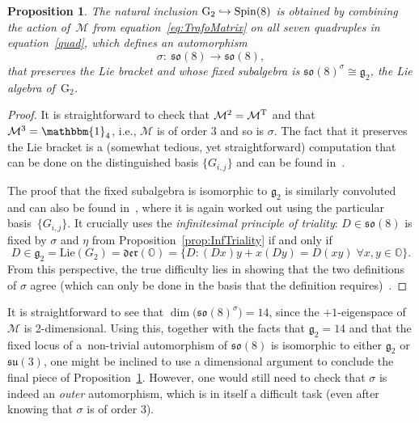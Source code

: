 \documentclass[10pt,a4paper]{amsart}
\numberwithin{equation}{section}
\newcommand{\Oct}{{\mathbb O}}
\newcommand{\GG}{{\rm G}_2}
\newtheorem{Proposition}[Theorem]{Proposition}
 { \theoremstyle{definition}
\newtheorem{Definition}[Theorem]{Definition}
\newtheorem{Remark}[Theorem]{Remark} }
\begin{document}
\begin{Proposition}\label{propf2} The natural inclusion $\GG \hookrightarrow \mathrm{Spin}(8)$ is obtained by combining the action of~$ \mathcal{M}$ from equation~\eqref{eq:TrafoMatrix} on all seven quadruples in equation~\eqref{quad}, which defines an automorphism \begin{equation} \sigma \colon \ \mathfrak{so}(8) \rightarrow \mathfrak{so}(8),\label{autosigma}\end{equation} that preserves the Lie bracket and whose fixed subalgebra is $\mathfrak{so}(8)^\sigma \cong \mathfrak{g}_2$, the Lie algebra of~$\mathrm{G}_2$.
\end{Proposition}
\begin{proof}
It is straightforward to check that $ \mathcal{M}^2 = \mathcal{M}^{\rm T}$ and that $ \mathcal{M}^3 = \mathbbm{1}_4$, i.e., $ \mathcal{M}$ is of order 3 and so is $\sigma$. The fact that it preserves the Lie bracket is a (somewhat tedious, yet straightforward) computation that can be done on the distinguished basis $\{ G_{i,j} \}$ and can be found in~\cite[Lem\-ma~1.3.2]{yokota}.

The proof that the fixed subalgebra is isomorphic to $\mathfrak{g}_2$ is similarly convoluted and can also be found in~\cite[Lemma~1.4.2]{yokota}, where it is again worked out using the particular basis~$\{ G_{i,j} \}$. It crucially uses the \textit{infinitesimal principle of triality}: $D \in \mathfrak{so}(8)$ is fixed by $\sigma$ and $\eta$ from Proposition~\ref{prop:InfTriality} if and only if
\begin{equation*}
 D \in \mathfrak{g}_2 = \textrm{Lie}(G_2) = \mathfrak{der}(\Oct) = \{ D \colon (Dx)y + x(Dy) =D(xy) \; \forall x,y \in \Oct \}.
\end{equation*}
From this perspective, the true difficulty lies in showing that the two definitions of $\sigma$ agree (which can only be done in the basis that the definition requires)~\cite{yokota}.
\end{proof}

\begin{Remark}
It is straightforward to see that $\dim \big( \mathfrak{so}(8)^\sigma \big) =14$, since the $+1$-eigenspace of~$\mathcal{M}$ is 2-dimensional. Using this, together with the facts that $\mathfrak{g}_2 = 14$ and that the fixed locus of a~non-trivial automorphism of $\mathfrak{so}(8)$ is isomorphic to either $\mathfrak{g}_2$ or $\mathfrak{su}(3)$, one might be inclined to use a dimensional argument to conclude the final piece of Proposition~\ref{propf2}. However, one would still need to check that $\sigma$ is indeed an \textit{outer} automorphism, which is in itself a difficult task (even after knowing that $\sigma$ is of order $3$).
\end{Remark}
\end{document}
